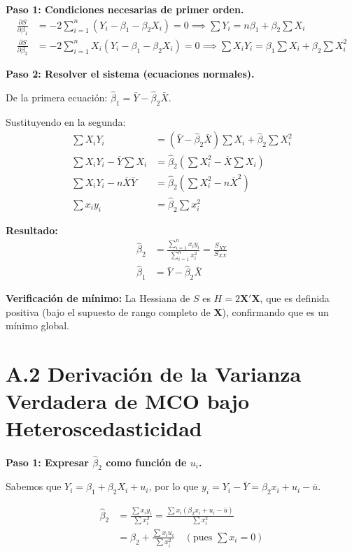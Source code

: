\documentclass[12pt,a4paper]{report}
\theoremstyle{definition}
\theoremstyle{remark}
\newcommand{\betahat}{\hat{\beta}}
\begin{document}
\textbf{Paso 1: Condiciones necesarias de primer orden.}
\begin{align*}
  \frac{\partial S}{\partial \beta_1} &= -2\sum_{i=1}^n (Y_i - \beta_1 - \beta_2 X_i) = 0 \implies \sum Y_i = n\beta_1 + \beta_2 \sum X_i\\
  \frac{\partial S}{\partial \beta_2} &= -2\sum_{i=1}^n X_i(Y_i - \beta_1 - \beta_2 X_i) = 0 \implies \sum X_i Y_i = \beta_1 \sum X_i + \beta_2 \sum X_i^2
\end{align*}

\textbf{Paso 2: Resolver el sistema (ecuaciones normales).}

De la primera ecuación: $\betahat_1 = \bar{Y} - \betahat_2 \bar{X}$.

Sustituyendo en la segunda:
\begin{align*}
  \sum X_i Y_i &= (\bar{Y} - \betahat_2 \bar{X})\sum X_i + \betahat_2 \sum X_i^2\\
  \sum X_i Y_i - \bar{Y}\sum X_i &= \betahat_2\left(\sum X_i^2 - \bar{X}\sum X_i\right)\\
  \sum X_i Y_i - n\bar{X}\bar{Y} &= \betahat_2\left(\sum X_i^2 - n\bar{X}^2\right)\\
  \sum x_i y_i &= \betahat_2 \sum x_i^2
\end{align*}

\textbf{Resultado:}
\begin{align}
  \betahat_2 &= \frac{\sum_{i=1}^n x_i y_i}{\sum_{i=1}^n x_i^2} = \frac{S_{XY}}{S_{XX}} \label{eq:beta2_final}\\
  \betahat_1 &= \bar{Y} - \betahat_2 \bar{X} \label{eq:beta1_final}
\end{align}

\textbf{Verificación de mínimo:} La Hessiana de $S$ es $H = 2\mathbf{X}'\mathbf{X}$, que es definida positiva (bajo el supuesto de rango completo de $\mathbf{X}$), confirmando que es un mínimo global.

\section*{A.2 Derivación de la Varianza Verdadera de MCO bajo Heteroscedasticidad}

\textbf{Paso 1: Expresar $\betahat_2$ como función de $u_i$.}

Sabemos que $Y_i = \beta_1 + \beta_2 X_i + u_i$, por lo que $y_i = Y_i - \bar{Y} = \beta_2 x_i + u_i - \bar{u}$.

\begin{align*}
  \betahat_2 &= \frac{\sum x_i y_i}{\sum x_i^2} = \frac{\sum x_i(\beta_2 x_i + u_i - \bar{u})}{\sum x_i^2}\\
  &= \beta_2 + \frac{\sum x_i u_i}{\sum x_i^2} \quad \left(\text{pues }\sum x_i = 0\right)
\end{align*}
\end{document}
